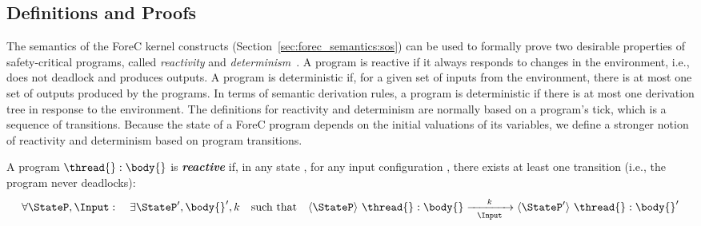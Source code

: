 \subsection{Definitions and Proofs}
\label{sec:forec_proofs}

The semantics of the ForeC kernel constructs (Section~\ref{sec:forec_semantics:sos}) 
can be used to
formally prove two desirable properties of safety-critical
programs, called \emph{reactivity} and
\emph{determinism}~\cite{Maraninchi92,Tardieu07}. A program
is reactive if it always responds to changes in the
environment, i.e., does not deadlock and produces outputs. 
A program is deterministic if, for a given set of inputs from the 
environment, there is at most one set of outputs produced by the 
programs. In terms of semantic derivation rules, a program is 
deterministic if there is at most one derivation tree in
response to the environment. The
definitions for reactivity and determinism are normally
based on a program's tick, which is a sequence of
transitions. Because the state of a ForeC program depends on
the initial valuations of its variables, we define a stronger notion
of reactivity and determinism based on program transitions. 


\begin{definition}
	\label{def:reactive}
	A program $\thread{}:\body{}$ is \emph{\textbf{reactive}} if,  
	in any state \StateP{}, for any input configuration \Input{}, 
	there exists at least one transition
	(i.e., the program never deadlocks):
	\begin{equation*}
		\forall \StateP, \Input: \quad
		\exists \StateP', \body{}', k
		\quad \text{such that} \quad
		\langle \StateP \rangle ~ \thread{}:\body{} 
			\xrightarrow[~~\Input~~]{k} 
		\langle \StateP' \rangle ~ \thread{}:\body{}'
	\end{equation*}
\end{definition}

